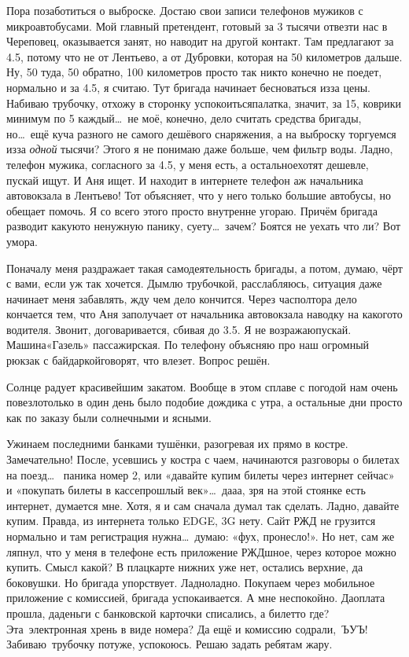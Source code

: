 Пора позаботиться о выброске. Достаю свои записи телефонов мужиков с микроавтобусами. Мой главный претендент, готовый за 3 тысячи отвезти нас в Череповец, оказывается занят, но наводит на другой контакт. Там предлагают за 4.5, потому что не от Лентьево, а от Дубровки, которая на 50 километров дальше. Ну, 50 туда, 50 обратно, 100 километров просто так никто конечно не поедет, нормально и за 4.5, я считаю. Тут бригада начинает бесноваться из\sdash за цены. Набиваю трубочку, отхожу в сторонку успокоиться\mdash палатка, значит, за 15, коврики минимум по 5 каждый\ldots~не моё, конечно, дело считать средства бригады, но\ldots~ещё куча разного не самого дешёвого снаряжения, а на выброску торгуемся из\sdash за \textit{одной} тысячи? Этого я не понимаю даже больше, чем фильтр воды. Ладно, телефон  мужика, согласного за 4.5, у  меня есть, а остальное\mdash хотят дешевле, пускай ищут. И Аня ищет. И находит в интернете телефон аж начальника автовокзала в Лентьево! Тот объясняет, что у него только большие автобусы, но обещает помочь. Я со всего этого просто внутренне угораю. Причём бригада разводит какую\sdash то ненужную панику, суету\ldots~зачем? Боятся не уехать что ли? Вот умора.

Поначалу меня раздражает такая самодеятельность бригады, а потом, думаю, чёрт с вами, если уж так хочется. Дымлю трубочкой, расслабляюсь, ситуация даже начинает меня забавлять, жду чем дело кончится. Через час\sdash полтора дело кончается тем, что Аня заполучает от начальника автовокзала наводку на какого\sdash то водителя. Звонит, договаривается, сбивая до 3.5. Я не возражаю\mdash пускай. Машина\mdash «Газель» пассажирская. По телефону объясняю про наш огромный рюкзак с байдаркой\mdash говорят, что влезет. Вопрос решён.

Солнце радует красивейшим закатом. Вообще в этом сплаве с погодой нам очень повезло\mdash только в один день было подобие дождика с утра, а остальные дни просто как по заказу были солнечными и ясными.

Ужинаем последними банками тушёнки, разогревая их прямо в костре. Замечательно! После, усевшись у костра с чаем, начинаются разговоры о билетах на поезд\ldots~ паника номер 2, или «давайте купим билеты через интернет сейчас» и «покупать билеты в кассе\mdash прошлый век»\ldots~да\sdash а\sdash а, зря на этой стоянке есть интернет, думается мне. Хотя, я и сам сначала думал так сделать. Ладно, давайте купим. Правда, из интернета только EDGE, 3G нету. Сайт РЖД не грузится нормально и там регистрация нужна\ldots~думаю: «фух, пронесло!». Но нет, сам же ляпнул, что у меня в телефоне есть приложение РЖД\sdash шное, через которое можно купить. Смысл какой? В плацкарте нижних уже нет, остались верхние, да боковушки. Но бригада упорствует. Ладно\sdash ладно. Покупаем через мобильное приложение с комиссией, бригада успокаивается. А мне неспокойно. Да\mdash оплата прошла, да\mdash деньги с банковской карточки списались, а билет\sdash то где? Эта~электронная хрень в виде номера? Да ещё и комиссию содрали,~ЪУЪ! Забиваю~трубочку потуже, успокоюсь. Решаю задать ребятам жару.

